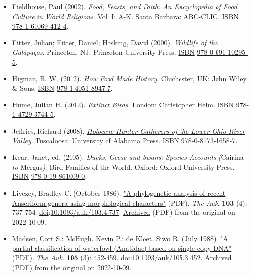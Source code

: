 \documentclass[11pt,a4paper]{article}
\begin{document}
\begin{itemize}
\item Fieldhouse, Paul (2002). \href{https://books.google.com/books?id=P-FqDgAAQBAJ\&pg=PA167}{\textit{Food, Feasts, and Faith: An Encyclopedia of Food Culture in World Religions}}. Vol. I: A-K. Santa Barbara: ABC-CLIO. \href{/wiki/ISBN\_\%28identifier\%29}{ISBN} \href{/wiki/Special:BookSources/978-1-61069-412-4}{978-1-61069-412-4}.
\item Fitter, Julian; Fitter, Daniel; Hosking, David (2000). \textit{Wildlife of the Galápagos}. Princeton, NJ: Princeton University Press. \href{/wiki/ISBN\_\%28identifier\%29}{ISBN} \href{/wiki/Special:BookSources/978-0-691-10295-5}{978-0-691-10295-5}.
\item Higman, B. W. (2012). \href{https://books.google.com/books?id=YIUoz98yMvgC\&pg=RA1-PA1801}{\textit{How Food Made History}}. Chichester, UK: John Wiley \& Sons. \href{/wiki/ISBN\_\%28identifier\%29}{ISBN} \href{/wiki/Special:BookSources/978-1-4051-8947-7}{978-1-4051-8947-7}.
\item Hume, Julian H. (2012). \href{https://books.google.com/books?id=40sxDwAAQBAJ\&pg=PA53}{\textit{Extinct Birds}}. London: Christopher Helm. \href{/wiki/ISBN\_\%28identifier\%29}{ISBN} \href{/wiki/Special:BookSources/978-1-4729-3744-5}{978-1-4729-3744-5}.
\item Jeffries, Richard (2008). \href{https://archive.org/details/holocenehunterga0000jeff/mode/2up}{\textit{Holocene Hunter-Gatherers of the Lower Ohio River Valley}}. Tuscaloosa: University of Alabama Press. \href{/wiki/ISBN\_\%28identifier\%29}{ISBN} \href{/wiki/Special:BookSources/978-0-8173-1658-7}{978-0-8173-1658-7}.
\item Kear, Janet, ed. (2005). \textit{Ducks, Geese and Swans: Species Accounts (}Cairina \textit{to} Mergus\textit{)}. Bird Families of the World. Oxford: Oxford University Press. \href{/wiki/ISBN\_\%28identifier\%29}{ISBN} \href{/wiki/Special:BookSources/978-0-19-861009-0}{978-0-19-861009-0}.
\item Livezey, Bradley C. (October 1986). \href{https://sora.unm.edu/sites/default/files/journals/auk/v103n04/p0737-p0754.pdf}{"A phylogenetic analysis of recent Anseriform genera using morphological characters"} (PDF). \textit{The Auk}. \textbf{103} (4): 737-754. \href{/wiki/Doi\_\%28identifier\%29}{doi}:\href{https://doi.org/10.1093\%2Fauk\%2F103.4.737}{10.1093/auk/103.4.737}. \href{https://ghostarchive.org/archive/20221009/https://sora.unm.edu/sites/default/files/journals/auk/v103n04/p0737-p0754.pdf}{Archived} (PDF) from the original on 2022-10-09.
\item Madsen, Cort S.; McHugh, Kevin P.; de Kloet, Siwo R. (July 1988). \href{https://sora.unm.edu/sites/default/files/journals/auk/v105n03/p0452-p0459.pdf}{"A partial classification of waterfowl (Anatidae) based on single-copy DNA"} (PDF). \textit{The Auk}. \textbf{105} (3): 452-459. \href{/wiki/Doi\_\%28identifier\%29}{doi}:\href{https://doi.org/10.1093\%2Fauk\%2F105.3.452}{10.1093/auk/105.3.452}. \href{https://ghostarchive.org/archive/20221009/https://sora.unm.edu/sites/default/files/journals/auk/v105n03/p0452-p0459.pdf}{Archived} (PDF) from the original on 2022-10-09.

\end{itemize}
\end{document}

